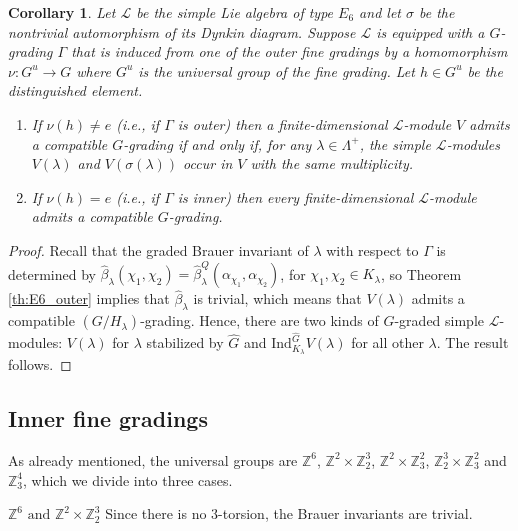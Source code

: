 \documentclass[a4paper,reqno]{amsart}
\newtheorem{corollary}[theorem]{Corollary}
\theoremstyle{definition}
\numberwithin{theorem}{section}
\numberwithin{equation}{section}
\begin{document}
\begin{corollary}
Let ${\mathcal{L}}$ be the simple Lie algebra of type $E_6$ and let $\sigma$ be the nontrivial automorphism of its Dynkin diagram. Suppose ${\mathcal{L}}$ is equipped with a $G$-grading $\Gamma$ that is induced from one of the outer fine gradings by a homomorphism $\nu\colon G^u\to G$ where $G^u$ is the universal group of the fine grading. Let $h\in G^u$ be the distinguished element.
\begin{enumerate}
\item[(a)] If $\nu(h)\ne e$ (i.e., if $\Gamma$ is outer) then a finite-dimensional ${\mathcal{L}}$-module $V$ admits a compatible $G$-grading if and only if, for any $\lambda\in\Lambda^+$, the simple ${\mathcal{L}}$-modules $V(\lambda)$ and $V(\sigma(\lambda))$ occur in $V$ with the same multiplicity.
\item[(b)] If $\nu(h)=e$ (i.e., if $\Gamma$ is inner) then every finite-dimensional ${\mathcal{L}}$-module admits a compatible $G$-grading. 
\end{enumerate}
\end{corollary}

\begin{proof}
Recall that the graded Brauer invariant of $\lambda$ with respect to $\Gamma$ is determined by $\hat{\beta}_\lambda(\chi_1,\chi_2)=\hat{\beta}^Q_\lambda(\alpha_{\chi_1},\alpha_{\chi_2})$, for $\chi_1,\chi_2\in K_\lambda$, so Theorem \ref{th:E6_outer} implies that $\hat{\beta}_\lambda$ is trivial, which means that $V(\lambda)$ admits a compatible $(G/H_\lambda)$-grading. Hence, there are two kinds of $G$-graded simple ${\mathcal{L}}$-modules: $V(\lambda)$ for $\lambda$ stabilized by ${\widehat{{G}}}$ and ${\mathrm{Ind}}_{K_\lambda}^{{\widehat{{G}}}} V(\lambda)$ for all other $\lambda$. The result follows.
\end{proof}

\subsection{Inner fine gradings} 
As already mentioned, the universal groups are ${\mathbb{Z}}^6$, ${\mathbb{Z}}^2\times{\mathbb{Z}}_2^3$, ${\mathbb{Z}}^2\times{\mathbb{Z}}_3^2$, ${\mathbb{Z}}_2^3\times {\mathbb{Z}}_3^2$ and ${\mathbb{Z}}_3^4$, which we divide into three cases.

\medskip

$\boxed{{\mathbb{Z}}^6\text{ and }{\mathbb{Z}}^2\times{\mathbb{Z}}_2^3}$\quad
Since there is no $3$-torsion, the Brauer invariants are trivial.
\end{document}
